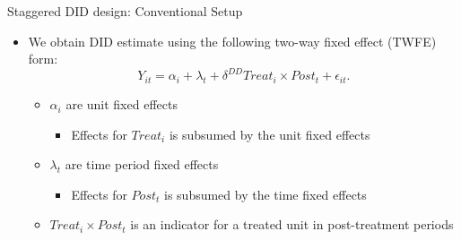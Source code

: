 \documentclass[dvipsnames,hyperref={pdfpagelabels=false}]{beamer}
\begin{document}
\begin{frame}{Staggered DID design: Conventional Setup}{}
	\begin{itemize}
		\item We obtain DID estimate using the following two-way fixed effect (TWFE) form:
		\vspace{0.2cm}
		\begin{equation*}
			Y_{it} = \alpha_{i} + \lambda_{t}+ \delta^{DD} Treat_{i} \times Post_{t} + \epsilon_{it}.
		\end{equation*}

	\begin{itemize}
	\item $\alpha_{i}$ are unit fixed effects
	\vspace{0.2cm}
		\begin{itemize}
	\item Effects for $Treat_{i}$ is subsumed by the unit fixed effects
\end{itemize}	
	\vspace{0.2cm}
	\item $\lambda_{t}$ are time period fixed effects
	\vspace{0.2cm}
	\begin{itemize}
		\item Effects for $Post_{t}$ is subsumed by the time fixed effects
	\end{itemize}	
	\vspace{0.2cm}
	\item $Treat_{i} \times Post_{t}$ is an indicator for a treated unit in post-treatment periods 
	\vspace{0.2cm}
	
	
\end{itemize}	
	
		
		
	\end{itemize}
\end{frame}
\end{document}

